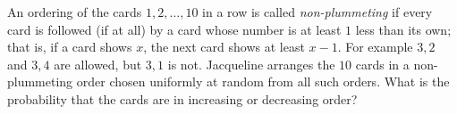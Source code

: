 An ordering of the cards $1,2,\dots,10$ in a row is called \emph{non-plummeting} if every card is followed (if at all) by a card whose number is at least $1$ less than its own; that is, if a card shows $x$, the next card shows at least $x-1$. For example $3,2$ and $3,4$ are allowed, but $3,1$ is not. Jacqueline arranges the $10$ cards in a non-plummeting order chosen uniformly at random from all such orders. What is the probability that the cards are in increasing or decreasing order?
